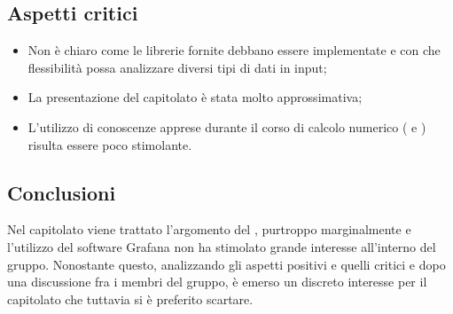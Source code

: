 \subsection{Aspetti critici}
\begin{itemize}
\item Non è chiaro come le librerie fornite debbano essere implementate e con che flessibilità possa analizzare diversi tipi di dati in input;
\item La presentazione del capitolato è stata molto approssimativa;
\item L'utilizzo di conoscenze apprese durante il corso di calcolo numerico ( e ) risulta essere poco stimolante.

\end{itemize}
\subsection{Conclusioni}
Nel capitolato viene trattato l'argomento del , purtroppo marginalmente e l'utilizzo del software Grafana non ha stimolato grande interesse all'interno del gruppo. Nonostante questo, analizzando gli aspetti positivi e quelli critici e dopo una discussione fra i membri del gruppo, \`e emerso un discreto interesse per il capitolato che tuttavia si è preferito scartare.